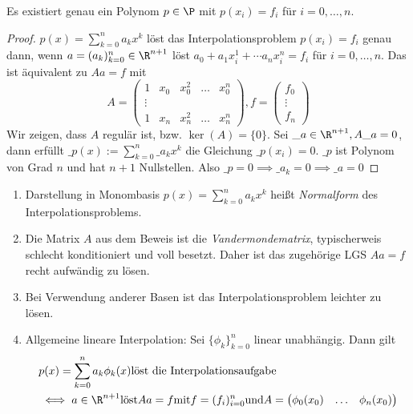 \documentclass[11pt]{scrbook}
\begin{document}
\begin{st}
	\label{1.1}
	Es existiert genau ein Polynom $p\in \P$ mit $p(x_i)=f_i$ für $i=0,\dotsc,n$.
	\begin{proof}
		$p(x) = \sum_{k=0}^n a_k x^k$ löst das Interpolationsproblem $p(x_i)=f_i$ genau dann, wenn $a=(a_k)_{k=0}^n \in \R^{n+1}$ löst $a_0 +a_1x_i^1 + \dotsb a_nx_i^n = f_i$ für $i=0,\dotsc,n$.
		Das ist äquivalent zu $Aa=f$ mit
		\[
		A= \begin{pmatrix} 1 & x_0 & x_0^2 & \hdots & x_0^n \\
		\vdots  \\
		1 & x_n & x_n^2 & \hdots & x_n^n\end{pmatrix}, f= \begin{pmatrix}f_0 \\ \vdots \\ f_n\end{pmatrix}
		\]
		Wir zeigen, dass $A$ regulär ist, bzw. $\ker(A) = \{0\}$.
		Sei $\_a \in \R^{n+1}, A\_a=0$, dann erfüllt
		$\_p(x) := \sum_{k=0}^n\_a_k x^k$ die Gleichung $\_p(x_i)=0$.
		$\_p$ ist Polynom von Grad $n$ und hat $n+1$ Nullstellen. Also $\_p=0 \implies \_a_k=0 \implies \_a=0$
	\end{proof}
	\begin{note}
		\begin{enumerate}
			\item 
				Darstellung in Monombasis $p(x)= \sum_{k=0}^n a_kx^k$ heißt \emph{Normalform} des Interpolationsproblems.
			\item
				Die Matrix $A$ aus dem Beweis ist die \emph{Vandermondematrix}, typischerweis schlecht konditioniert und voll besetzt.
				Daher ist das zugehörige LGS $Aa=f$ recht aufwändig zu lösen.
			\item
				Bei Verwendung anderer Basen ist das Interpolationsproblem leichter zu lösen.
			\item
				Allgemeine lineare Interpolation:
				Sei $\{\phi_k\}_{k=0}^n$ linear unabhängig. Dann gilt
				\begin{align*}
					&p(x) = \sum_{k=0}^n a_k \phi_k(x) \text{löst die Interpolationsaufgabe}\\
					&\iff a\in \R^{n+1} \text{löst} Aa=f \text{mit} f=(f_i)_{i=0}^n \text{und} A= \begin{pmatrix}\phi_0(x_0) & \hdots & \phi_n(x_0)\\
					\end{pmatrix}
				\end{align*}
		\end{enumerate}
		
	\end{note}
\end{st}
\end{document}
